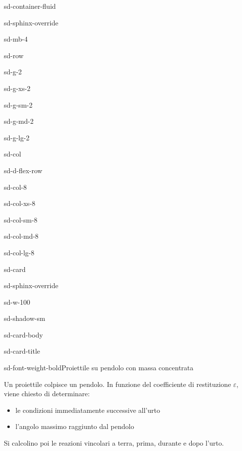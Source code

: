 \documentclass[letterpaper,10pt,italian]{jupyterBook}
\begin{document}
\begin{sphinxuseclass}{sd-container-fluid}
\begin{sphinxuseclass}{sd-sphinx-override}
\begin{sphinxuseclass}{sd-mb-4}
\begin{sphinxuseclass}{sd-row}
\begin{sphinxuseclass}{sd-g-2}
\begin{sphinxuseclass}{sd-g-xs-2}
\begin{sphinxuseclass}{sd-g-sm-2}
\begin{sphinxuseclass}{sd-g-md-2}
\begin{sphinxuseclass}{sd-g-lg-2}
\begin{sphinxuseclass}{sd-col}
\begin{sphinxuseclass}{sd-d-flex-row}
\begin{sphinxuseclass}{sd-col-8}
\begin{sphinxuseclass}{sd-col-xs-8}
\begin{sphinxuseclass}{sd-col-sm-8}
\begin{sphinxuseclass}{sd-col-md-8}
\begin{sphinxuseclass}{sd-col-lg-8}
\begin{sphinxuseclass}{sd-card}
\begin{sphinxuseclass}{sd-sphinx-override}
\begin{sphinxuseclass}{sd-w-100}
\begin{sphinxuseclass}{sd-shadow-sm}
\begin{sphinxuseclass}{sd-card-body}
\begin{sphinxuseclass}{sd-card-title}
\begin{sphinxuseclass}{sd-font-weight-bold}Proiettile su pendolo con massa concentrata
\end{sphinxuseclass}
\end{sphinxuseclass}
\sphinxAtStartPar
Un proiettile colpisce un pendolo. In funzione del coefficiente di restituzione \(\varepsilon\), viene chiesto di determinare:
\begin{itemize}
\item {} 
\sphinxAtStartPar
le condizioni immediatamente successive all’urto

\item {} 
\sphinxAtStartPar
l’angolo massimo raggiunto dal pendolo

\end{itemize}

\sphinxAtStartPar
Si calcolino poi le reazioni vincolari a terra, prima, durante e dopo l’urto.


\end{sphinxuseclass}
\end{sphinxuseclass}
\end{sphinxuseclass}
\end{sphinxuseclass}
\end{sphinxuseclass}
\end{sphinxuseclass}
\end{sphinxuseclass}
\end{sphinxuseclass}
\end{sphinxuseclass}
\end{sphinxuseclass}
\end{sphinxuseclass}
\end{sphinxuseclass}
\end{sphinxuseclass}
\end{sphinxuseclass}
\end{sphinxuseclass}
\end{sphinxuseclass}
\end{sphinxuseclass}
\end{sphinxuseclass}
\end{sphinxuseclass}
\end{sphinxuseclass}
\end{sphinxuseclass}
\end{document}
